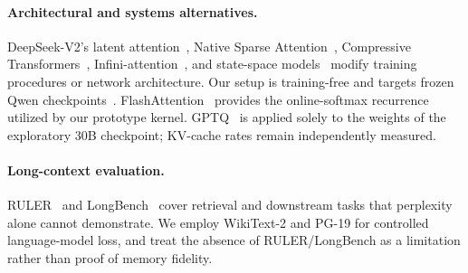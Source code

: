 \documentclass[10pt,twocolumn]{article}
\newcommand{\wikitext}{WikiText-2}
\newcommand{\pg}{PG-19}
\begin{document}
\paragraph{Architectural and systems alternatives.}
DeepSeek-V2's latent attention~\cite{deepseek2024v2}, Native Sparse Attention~\cite{yuan2025nsa}, Compressive Transformers~\cite{rae2019compressive}, Infini-attention~\cite{munkhdalai2024infini}, and state-space models~\cite{dao2024mamba2} modify training procedures or network architecture. Our setup is training-free and targets frozen Qwen checkpoints~\cite{qwen25,qwen3}. FlashAttention~\cite{dao2022flashattention} provides the online-softmax recurrence utilized by our prototype kernel. GPTQ~\cite{frantar2023gptq} is applied solely to the weights of the exploratory 30B checkpoint; KV-cache rates remain independently measured.

\paragraph{Long-context evaluation.}
RULER~\cite{hsieh2024ruler} and LongBench~\cite{bai2023longbench} cover retrieval and downstream tasks that perplexity alone cannot demonstrate. We employ \wikitext{} and \pg{} for controlled language-model loss, and treat the absence of RULER/LongBench as a limitation rather than proof of memory fidelity.
\end{document}
